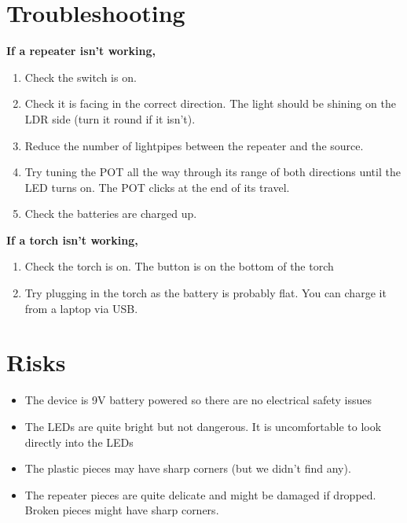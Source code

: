 \documentclass[12pt]{article}
\begin{document}
\section{Troubleshooting}

\textbf{If a repeater isn't working,}
\begin{enumerate}
\item Check the switch is on.
\item Check it is facing in the correct direction. The light should be shining on the LDR side (turn it round if it isn't).
\item Reduce the number of lightpipes between the repeater and the source.
\item Try tuning the POT all the way through its range of both directions until the LED turns on. The POT clicks at the end of its travel.
\item Check the batteries are charged up.
\end{enumerate}
%
\textbf{If a torch isn't working,}
\begin{enumerate}
    \item Check the torch is on. The button is on the bottom of the torch
    \item Try plugging in the torch as the battery is probably flat. You can charge it from a laptop via USB.
\end{enumerate}


\section{Risks}
\begin{itemize}
\item The device is 9V battery powered so there are no electrical safety issues
\item The LEDs are quite bright but not dangerous. It is uncomfortable to look directly into the LEDs
\item The plastic pieces may have sharp corners (but we didn't find any).
\item The repeater pieces are quite delicate and might be damaged if dropped. Broken pieces might have sharp corners.
\end{itemize}

\end{document}
